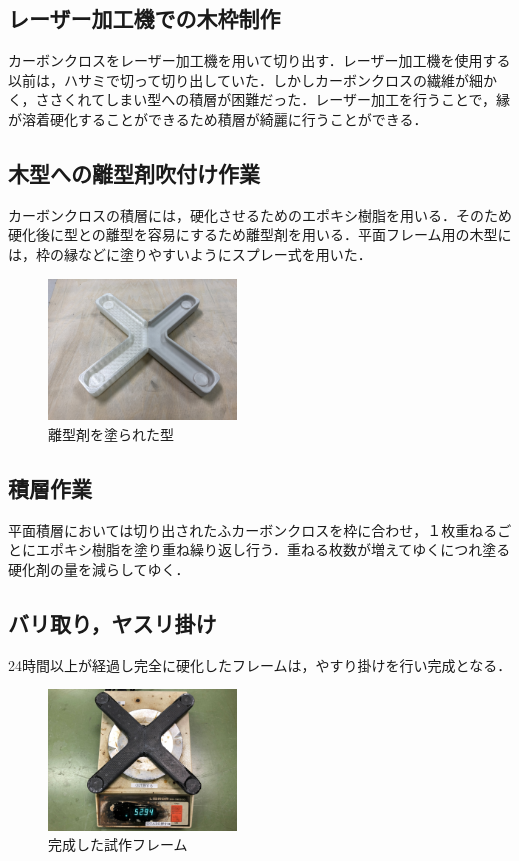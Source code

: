 \documentclass[twocolumn,11pt]{abst}
\begin{document}
\subsection{レーザー加工機での木枠制作}
カーボンクロスをレーザー加工機を用いて切り出す．レーザー加工機を使用する以前は，ハサミで切って切り出していた．しかしカーボンクロスの繊維が細かく，ささくれてしまい型への積層が困難だった．レーザー加工を行うことで，縁が溶着硬化することができるため積層が綺麗に行うことができる．

\subsection{木型への離型剤吹付け作業}
カーボンクロスの積層には，硬化させるためのエポキシ樹脂を用いる．そのため硬化後に型との離型を容易にするため離型剤を用いる．平面フレーム用の木型には，枠の縁などに塗りやすいようにスプレー式を用いた．

\begin{figure}[htbp]
  \begin{center}
    \includegraphics[width=50mm]{img/f.jpg}
    \end{center}
  \caption{離型剤を塗られた型}
 \label{fig:a}
\end{figure}

\subsection{積層作業}
平面積層においては切り出されたふカーボンクロスを枠に合わせ，１枚重ねるごとにエポキシ樹脂を塗り重ね繰り返し行う．重ねる枚数が増えてゆくにつれ塗る硬化剤の量を減らしてゆく．

\subsection{バリ取り，ヤスリ掛け}
24時間以上が経過し完全に硬化したフレームは，やすり掛けを行い完成となる．

\begin{figure}[htbp]
  \begin{center}
    \includegraphics[width=50mm]{img/d.jpg}
    \end{center}
  \caption{完成した試作フレーム}
 \label{fig:a}
\end{figure}
\end{document}
